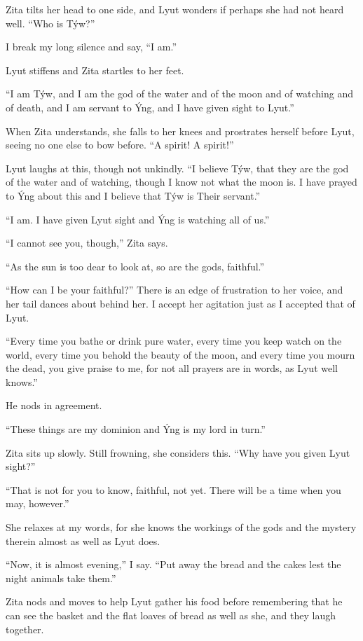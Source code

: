Zita tilts her head to one side, and Lyut wonders if perhaps she had not heard well. ``Who is Týw?''

I break my long silence and say, ``I am.''

Lyut stiffens and Zita startles to her feet.

``I am Týw, and I am the god of the water and of the moon and of watching and of death, and I am servant to Ýng, and I have given sight to Lyut.''

When Zita understands, she falls to her knees and prostrates herself before Lyut, seeing no one else to bow before. ``A spirit! A spirit!''

Lyut laughs at this, though not unkindly. ``I believe Týw, that they are the god of the water and of watching, though I know not what the moon is. I have prayed to Ýng about this and I believe that Týw is Their servant.''

``I am. I have given Lyut sight and Ýng is watching all of us.''

``I cannot see you, though,'' Zita says.

``As the sun is too dear to look at, so are the gods, faithful.''

``How can I be your faithful?'' There is an edge of frustration to her voice, and her tail dances about behind her. I accept her agitation just as I accepted that of Lyut.

``Every time you bathe or drink pure water, every time you keep watch on the world, every time you behold the beauty of the moon, and every time you mourn the dead, you give praise to me, for not all prayers are in words, as Lyut well knows.''

He nods in agreement.

``These things are my dominion and Ýng is my lord in turn.''

Zita sits up slowly. Still frowning, she considers this. ``Why have you given Lyut sight?''

``That is not for you to know, faithful, not yet. There will be a time when you may, however.''

She relaxes at my words, for she knows the workings of the gods and the mystery therein almost as well as Lyut does.

``Now, it is almost evening,'' I say. ``Put away the bread and the cakes lest the night animals take them.''

Zita nods and moves to help Lyut gather his food before remembering that he can see the basket and the flat loaves of bread as well as she, and they laugh together.

